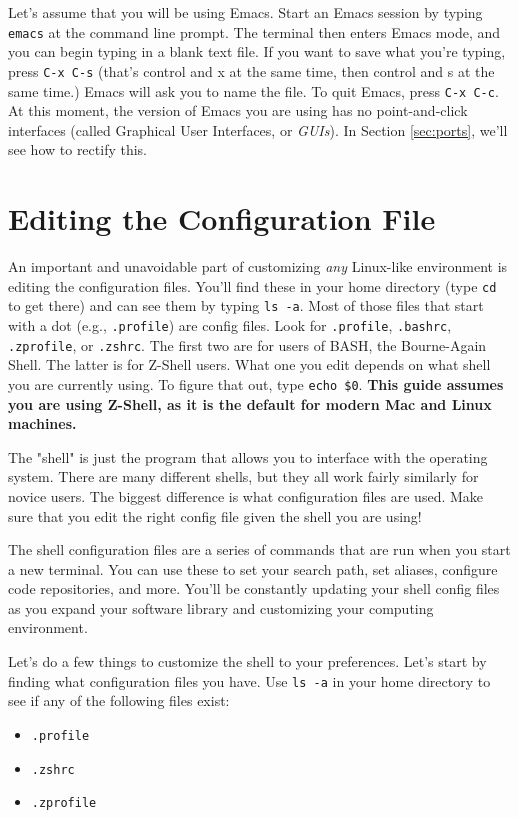 \documentclass[12pt, letterpaper]{article}
\begin{document}
Let's assume that you will be using Emacs.  Start an Emacs session by
typing {\tt emacs} at the command line prompt.  The terminal then enters Emacs
mode, and you can begin typing in a blank text file.  If you want to save
what you're typing, press {\tt C-x C-s} (that's control and x at the same time,
then control and s at the same time.)  Emacs will ask you to name the file.
To quit Emacs, press {\tt C-x C-c}.  At this moment, the version of Emacs you are
using has no point-and-click interfaces (called Graphical User Interfaces, or
\emph{GUIs}).  In Section \ref{sec:ports}, we'll see how to rectify this.

\section{Editing the Configuration File}
An important and unavoidable part of customizing \emph{any} Linux-like
environment is editing the configuration files.  You'll find these in your
home directory (type {\tt cd} to get there) and can see them by typing
{\tt ls -a}.  Most of
those files that start with a dot (e.g., {\tt .profile}) are config files.
Look for {\tt .profile}, {\tt .bashrc}, {\tt .zprofile}, or {\tt .zshrc}.
The first two are for users of BASH, the
Bourne-Again Shell.  The latter is for Z-Shell users.  What one you edit
depends on what shell you are currently using.  To figure that out, type
{\tt echo \$0}.  \textbf{This guide assumes you are using Z-Shell, as it is the
  default for modern Mac and Linux machines.}

\begin{tcolorbox}[title=\textbf{Shell Shock}]
  The "shell" is just the program that allows you to interface with the
  operating system. There are many different shells, but they all work
  fairly similarly for novice users. The biggest difference is what configuration
  files are used. Make sure that you edit the right config file given the
  shell you are using!
\end{tcolorbox}

The shell configuration files are a series of commands that are run when you
start a new terminal.  You can use these to set your search path, set aliases,
configure code repositories, and more.  You'll be constantly updating your
shell config files as you expand your software library and customizing your
computing environment.

Let's do a few things to customize the shell to your preferences.  Let's start
by finding what configuration files you have.  Use {\tt ls -a} in your home
directory to see if any of the following files exist:
\begin{itemize}
\item {\tt .profile}
\item {\tt .zshrc}
\item {\tt .zprofile}
\end{itemize}
\end{document}
